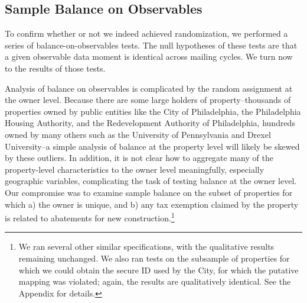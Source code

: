 \documentclass[12pt,titlepage]{article}
\begin{document}
\subsection{Sample Balance on Observables}

To confirm whether or not we indeed achieved randomization, we
performed a series of balance-on-observables tests. The null
hypotheses of these tests are that a given observable data moment is
identical across mailing cycles. We turn now to the results of those
tests.

Analysis of balance on observables is complicated by the random
assignment at the owner level.  Because there are some large holders
of property--thousands of properties owned by public entities like
the City of Philadelphia, the Philadelphia Housing Authority, and the
Redevelopment Authority of Philadelphia, hundreds owned by many others
such as the University of Pennsylvania and Drexel University--a
simple analysis of balance at the property level will likely be skewed
by these outliers. In addition, it is not clear how to aggregate many
of the property-level characteristics to the owner level meaningfully,
especially geographic variables, complicating the task of testing 
balance at the owner level. Our compromise was
to examine sample balance on the subset of properties for which a) the
owner is unique, and b) any tax exemption claimed by the property is
related to abatements for new construction.\footnote{We ran several
  other similar specifications, with the qualitative results remaining
  unchanged. We also ran tests on the subsample of properties for
  which we could obtain the secure ID used by the City, for which the
  putative mapping was violated; again, the results are qualitatively
  identical. See the Appendix for details.}
\end{document}
